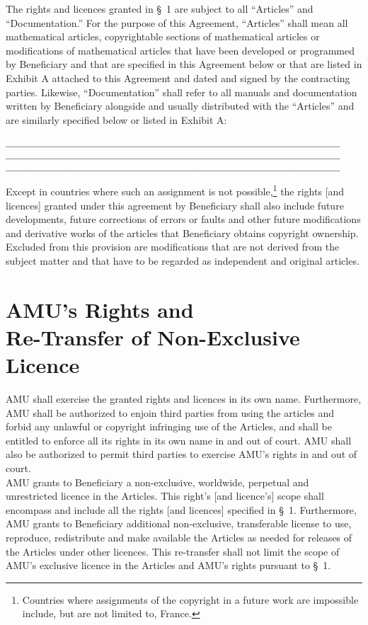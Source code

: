 The rights and licences granted in {\S}~1 are subject to all
``Articles'' and ``Documentation.'' For the purpose of this Agreement,
``Articles'' shall mean all mathematical articles, copyrightable sections
of mathematical articles or modifications of mathematical articles that have
been developed or programmed by Beneficiary and that are specified in
this Agreement below or that are listed in Exhibit A attached to this
Agreement and dated and signed by the contracting parties. Likewise,
``Documentation'' shall refer to all manuals and documentation written
by Beneficiary alongside and usually distributed with the ``Articles''
and are similarly specified below or listed in Exhibit A:
\begin{alltt}
    __________________________________________________________________
    __________________________________________________________________
    __________________________________________________________________
\end{alltt}
Except in countries where such an assignment is not
possible,\footnote{Countries where assignments of the copyright in a
future work are impossible include, but are not limited to, France.}
the rights [and licences] granted under this agreement by Beneficiary
shall also include future developments, future corrections of errors
or faults and other future modifications and derivative works of the
articles that Beneficiary obtains copyright ownership.  Excluded from
this provision are modifications that are not derived from the subject
matter and that have to be regarded as independent and original
articles. 

\section{AMU's Rights and \\Re-Transfer of Non-Exclusive Licence}
\A AMU shall exercise the granted rights and licences in its
own name. Furthermore, AMU shall be authorized to enjoin third
parties from using the articles and forbid any unlawful or copyright
infringing use of the Articles, and shall be entitled to enforce all
its rights in its own name in and out of court. AMU shall also
be authorized to permit third parties to exercise AMU's rights
in and out of court.\\ 

\A AMU grants to Beneficiary a non-exclusive, worldwide, perpetual
and unrestricted licence in the Articles. This right's [and licence's]
scope shall encompass and include all the rights [and licences]
specified in {\S}~1. Furthermore, AMU grants to Beneficiary
additional non-exclusive, transferable license to use, reproduce,
redistribute and make available the Articles as needed for releases of
the Articles under other licences.  This re-transfer shall not limit
the scope of AMU's exclusive licence in the Articles and AMU's
rights pursuant to {\S}~1.\\


